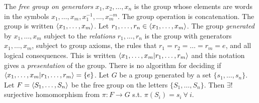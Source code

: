  The \textit{free group on generators} $x_1, x_2, \ldots, x_n$ is the group whose elements are words in the symbols $x_1, \ldots, x_m, x^{-1}_1, \ldots, x^{-m}_m$. The group operation is concatenation. The group is written $\langle x_1, \ldots, x_m \rangle$.
 Let $r_1, \ldots, r_n \in \langle x_1,\ldots, x_m \rangle$. The group \textit{generated} by $x_1,\ldots, x_m$ subject to the \textit{relations} $r_1, \ldots, r_n$ is the group with generators $x_1,\ldots, x_m$, subject to group axioms, the rules that $r_1 = r_2 = \ldots = r_m = e$, and all logical consequences. This is written $\langle x_1, \ldots, x_m | r_1, \ldots, r_m \rangle$ and this notation gives a \textit{presentation} of the group.
 There is no algorithm for deciding if $\langle x_1, \ldots, x_m | r_1, \ldots, r_m \rangle = \{e\}$.
 Let $G$ be a group generated by a set $\{s_1, \ldots, s_n\}$. Let $F = \langle S_1, \ldots, S_n \rangle$ be the free group on the letters $\{S_1, \ldots, S_n\}$. Then $\exists!$ surjective homomorphism from $\pi : F \to G$ s.t. $\pi(S_i) = s_i\ \forall\ i$.